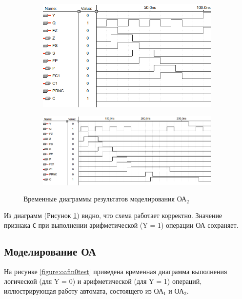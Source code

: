 \begin{figure}[H]
	\begin{subfigure}[b]{0.6\textwidth}
		\includegraphics[scale=0.6]{images/altera/rev2/OA2_PRNC/test2_WITH_CONTROL_SIGNAL_Y=0.png}
		\caption{}
	\end{subfigure}

	\begin{subfigure}[b]{1\textwidth}
		\includegraphics[scale=0.6]{images/altera/rev2/OA2_PRNC/test2_WITH_CONTROL_SIGNAL_Y=1.png}
		\caption{}
	\end{subfigure}
	\caption{Временные диаграммы результатов моделирования ОА$_2$}
	\label{figure:oa2test}
\end{figure}

Из диаграмм (Рисунок \ref{figure:oa2test}) видно, что схема работает корректно. Значение признака \texttt{C} при выполнении арифметической (Y = 1) операции ОА сохраняет.

\clearpage
\subsection{Моделирование ОА}

На рисунке \ref{figure:oafin0test} приведена временная диаграмма выполнения логической (для Y = 0) и арифметической (для Y = 1) операций, иллюстрирующая работу автомата, состоящего из ОА$_1$ и ОА$_2$.

